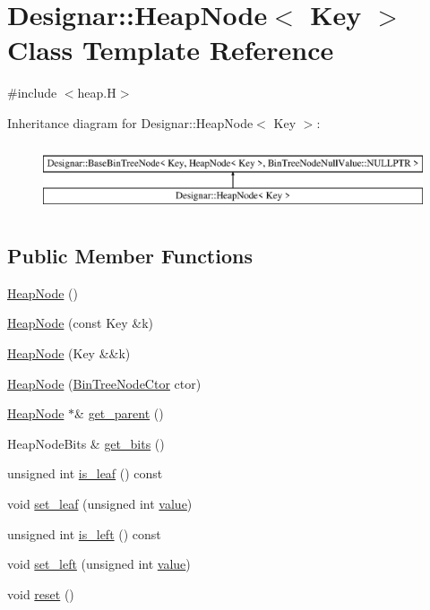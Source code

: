 \hypertarget{class_designar_1_1_heap_node}{}\section{Designar\+:\+:Heap\+Node$<$ Key $>$ Class Template Reference}
\label{class_designar_1_1_heap_node}


{\ttfamily \#include $<$heap.\+H$>$}

Inheritance diagram for Designar\+:\+:Heap\+Node$<$ Key $>$\+:\begin{figure}[H]
\begin{center}
\leavevmode
\includegraphics[height=2.000000cm]{class_designar_1_1_heap_node}
\end{center}
\end{figure}
\subsection*{Public Member Functions}
\begin{DoxyCompactItemize}
\item 
\hyperlink{class_designar_1_1_heap_node_ae38c08903f2c52e19c71d392661893f2}{Heap\+Node} ()
\item 
\hyperlink{class_designar_1_1_heap_node_ac5b4c9acb233f72e70b0dc3f4a46e3b5}{Heap\+Node} (const Key \&k)
\item 
\hyperlink{class_designar_1_1_heap_node_a29189c1b5cd10290c2332e40cadbb899}{Heap\+Node} (Key \&\&k)
\item 
\hyperlink{class_designar_1_1_heap_node_aa4287eba82bce2dae37c5e3f4012b1b4}{Heap\+Node} (\hyperlink{namespace_designar_a679bc99fd69a3601faa5d6d47f865106}{Bin\+Tree\+Node\+Ctor} ctor)
\item 
\hyperlink{class_designar_1_1_heap_node}{Heap\+Node} $\ast$\& \hyperlink{class_designar_1_1_heap_node_aacf1d59ac7645a1fe6479f93957dc1be}{get\+\_\+parent} ()
\item 
Heap\+Node\+Bits \& \hyperlink{class_designar_1_1_heap_node_a9fc6866e2550f415ec407b1c85ca54ab}{get\+\_\+bits} ()
\item 
unsigned int \hyperlink{class_designar_1_1_heap_node_ad0b5b06b0126cdd711970709c4fb2187}{is\+\_\+leaf} () const
\item 
void \hyperlink{class_designar_1_1_heap_node_a34ec910a7402b356d7b3d67200f794ec}{set\+\_\+leaf} (unsigned int \hyperlink{namespace_designar_a7dd2a7b6d96f664ce612b506c8eb2fb8}{value})
\item 
unsigned int \hyperlink{class_designar_1_1_heap_node_a778fa64fe1c4221eb7833cfb68713332}{is\+\_\+left} () const
\item 
void \hyperlink{class_designar_1_1_heap_node_a65a5b3a38d152072e756182600502d93}{set\+\_\+left} (unsigned int \hyperlink{namespace_designar_a7dd2a7b6d96f664ce612b506c8eb2fb8}{value})
\item 
void \hyperlink{class_designar_1_1_heap_node_a60340ca59bc0968899e960bc9d1b08b3}{reset} ()
\end{DoxyCompactItemize}
